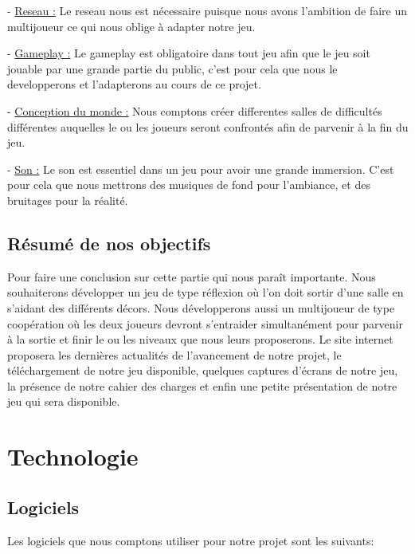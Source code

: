 \documentclass[a4paper]{article}
\begin{document}
\quad

- \underline{Reseau :} Le reseau nous est nécessaire puisque nous avons l’ambition de faire un multijoueur ce qui nous oblige à adapter notre jeu.

\quad

- \underline{Gameplay :} Le gameplay est obligatoire dans tout jeu afin que le jeu soit jouable par une grande partie du public, c’est pour cela que nous le developperons et l’adapterons au cours de ce projet.

\quad

- \underline{Conception du monde :} Nous comptons créer differentes salles de difficultés différentes auquelles le ou les joueurs seront confrontés afin de parvenir à la fin du jeu.

\quad

- \underline{Son :} Le son est essentiel dans un jeu pour avoir une grande immersion. C’est pour cela que nous mettrons des musiques de fond pour l'ambiance, et des bruitages pour la réalité.

\quad

	\subsection{Résumé de nos objectifs}

Pour faire une conclusion sur cette partie qui nous paraît importante. Nous souhaiterons développer un jeu de type réflexion où l'on doit sortir d'une salle en s'aidant des différents décors. Nous développerons aussi un multijoueur
de type coopération où les deux joueurs devront s'entraider simultanément pour parvenir à la sortie et finir le ou les niveaux que nous leurs proposerons.
Le site internet proposera les dernières actualités de l'avancement de notre projet, le téléchargement de notre jeu disponible, quelques captures d'écrans de notre jeu, la présence de notre cahier des charges et enfin une petite présentation de notre jeu qui sera disponible.
\newpage

\section{Technologie}
	\subsection{Logiciels}
Les logiciels que nous comptons utiliser pour notre projet sont les suivants:

\quad
\quad
\end{document}
